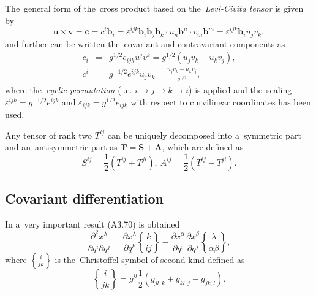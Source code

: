 \documentclass[preprint,12pt]{elsarticle}
\newcommand{\pdv}[2]{\frac{\partial{#1}}{\partial{#2}}}
\newcommand{\vect}[1]{\boldsymbol{#1}}
\newcommand{\matr}[1]{\mathbf{#1}}
\newcommand{\christ}[3]{\genfrac{\{}{\}}{0pt}{}{#1}{#2 #3}}
\begin{document}
The~general form of the~cross product 
based on the~\textit{Levi-Civita tensor} is given by
\begin{equation}
  \vect{u}\times\vect{v} = \vect{c} = c^i\vect{b}_i = 
  \varepsilon^{ijk}\vect{b}_i\vect{b}_j\vect{b}_k 
  \cdot u_n\vect{b}^n \cdot v_m\vect{b}^m 
  = \varepsilon^{ijk}\vect{b}_i u_j v_k ,
  \nonumber 
\end{equation}
and further can be written the~covariant and contravariant components as
\begin{eqnarray}
  c_i &=& g^{1/2}e_{ijk}u^j v^k = g^{1/2}(u_j v_k - u_k v_j) ,
  \label{eq:general_covariant_cross_product}\\
  c^i &=& g^{-1/2}e^{ijk}u_j v_k = \frac{u_j v_k - u_k v_j}{g^{1/2}} ,
  \label{eq:general_contravariant_cross_product}
\end{eqnarray}
where the~\textit{cyclic permutation} 
(i.e. $i\rightarrow j \rightarrow k \rightarrow i$) is applied 
and the~scaling $\varepsilon^{ijk} = g^{-1/2}e^{ijk}$ and
$\varepsilon_{ijk} = g^{1/2}e_{ijk}$ with respect to curvilinear coordinates
has been used. 

Any tensor of rank two $T^{ij}$ can be uniquely decomposed into a~symmetric 
part and an~antisymmetric part as $\matr{T} = \matr{S} + \matr{A}$, 
which are defined as
\begin{equation}
  S^{ij} = \frac{1}{2}(T^{ij} + T^{ji}),~
  A^{ij} = \frac{1}{2}(T^{ij} - T^{ji}) .
  \label{eq:matrix_decomposition}
\end{equation}

\subsection{Covariant differentiation}
In \cite{Mihalas_Mihalas-Foundations_of_Radiation_Hydrodynamics} a~very 
important result (A3.70) is obtained
\begin{equation}
  \frac{\partial^2\bar{x}^\lambda}{\partial q^i\partial q^j} = 
  \pdv{\bar{x}^\lambda}{q^k}\christ{k}{i}{j} -
  \pdv{\bar{x}^\alpha}{q^i}\pdv{\bar{x}^\beta}{q^j}
  \christ{\lambda}{\alpha}{\beta} ,
  \label{eq:Christ_result}
\end{equation}
where $\christ{i}{j}{k}$ is the~Christoffel symbol of second kind defined as
\begin{equation}
  \christ{i}{j}{k} = g^{il} \frac{1}{2}(g_{jl,k} + g_{kl,j} - g_{jk,l}) .
  \label{eq:Christ_definition}
\end{equation}
\end{document}
